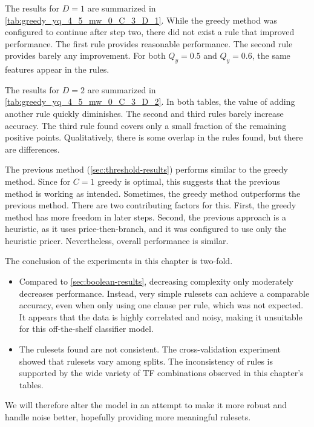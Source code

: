 The results for $D=1$ are summarized in \autoref{tab:greedy_yq_4_5_mw_0_C_3_D_1}.
While the greedy method was configured to continue after step two, there did not exist a rule that improved
performance.
The first rule provides reasonable performance.
The second rule provides barely any improvement.
For both $Q_y=0.5$ and $Q_y=0.6$, the same features appear in the rules.

The results for $D=2$ are summarized in \autoref{tab:greedy_yq_4_5_mw_0_C_3_D_2}.
In both tables, the value of adding another rule quickly diminishes.
The second and third rules barely increase accuracy.
The third rule found covers only a small fraction of the remaining positive points.
Qualitatively, there is some overlap in the rules found, but there are differences.

The previous method (\autoref{sec:threshold-results}) performs similar to the greedy method.
Since for $C=1$ greedy is optimal, this suggests that the previous method is working as intended.
Sometimes, the greedy method outperforms the previous method.
There are two contributing factors for this.
First, the greedy method has more freedom in later steps.
Second, the previous approach is a heuristic, as it uses price-then-branch, and it was configured to use
only the heuristic pricer.
Nevertheless, overall performance is similar.

The conclusion of the experiments in this chapter is two-fold.
\begin{itemize}
    \item Compared to \autoref{sec:boolean-results}, decreasing complexity only moderately decreases performance.
    Instead, very simple rulesets can achieve a comparable accuracy, even when only using one clause per rule,
    which was not expected.
    It appears that the data is highly correlated and noisy, making it unsuitable for this off-the-shelf classifier model.
    \item The rulesets found are not consistent.
    The cross-validation experiment showed that rulesets vary among splits.
    The inconsistency of rules is supported by the wide variety of TF combinations observed in this chapter's tables.
\end{itemize}
We will therefore alter the model in an attempt to make it more robust and handle noise better, hopefully
providing more meaningful rulesets.

